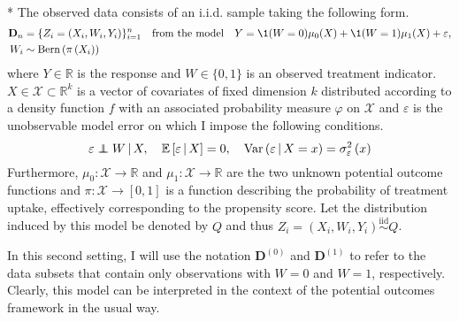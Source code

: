 \begin{boxD}
	\begin{asm}\label{asm:CATE_dgp}\mbox{}\\*
		The observed data consists of an i.i.d. sample taking the following form.
		\begin{equation}\label{DGP2}
			\begin{aligned}
				\mathbf{D}_n & = \{Z_{i} = (X_{i}, W_{i}, Y_{i})\}_{i = 1}^{n}
				\quad \text{from the model} \quad
				Y = \1(W = 0)\mu_{0}(X) + \1(W = 1)\mu_1(X) + \varepsilon,	\\
				W_{i} & \sim \operatorname{Bern}\left(\pi\left(X_{i}\right)\right)
			\end{aligned}
		\end{equation}
		where $Y \in \mathbb{R}$ is the response and $W \in \{0,1\}$ is an observed treatment indicator.
		$X \in \mathcal{X} \subset \mathbb{R}^k$ is a vector of covariates of fixed dimension $k$ distributed according to a density function $f$ with an associated probability measure $\varphi$ on $\mathcal{X}$ and $\varepsilon$ is the unobservable model error on which I impose the following conditions.
		\begin{equation}
			\varepsilon \perp\!\!\!\!\perp W \, | \, X, \quad
			\mathbb{E}\left[\varepsilon \, | \, X\right] = 0, \quad
			\text{Var}\left(\varepsilon \, | \, X = x\right) = \sigma_{\varepsilon}^2\left(x\right)
		\end{equation}
		Furthermore, $\mu_0:\mathcal{X} \rightarrow \mathbb{R}$ and $\mu_1:\mathcal{X} \rightarrow \mathbb{R}$ are the two unknown potential outcome functions and $\pi:\mathcal{X} \rightarrow [0,1]$ is a function describing the probability of treatment uptake, effectively corresponding to the propensity score.
		Let the distribution induced by this model be denoted by $Q$ and thus $Z_{i} = \left(X_{i}, W_{i}, Y_{i}\right) \overset{\text{iid}}{\sim} Q$.
	\end{asm}
\end{boxD}
In this second setting, I will use the notation $\mathbf{D}^{(0)}$ and $\mathbf{D}^{(1)}$ to refer to the data subsets that contain only observations with $W = 0$ and $W = 1$, respectively.
Clearly, this model can be interpreted in the context of the potential outcomes framework in the usual way.

